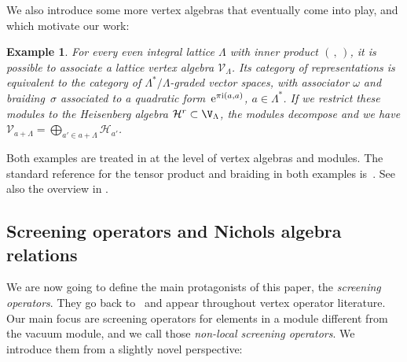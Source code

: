 \documentclass[10pt,a4paper]{amsart}
\numberwithin{equation}{section}
\newtheorem{ese}[teo]{Example}
\begin{document}
We also introduce some more vertex algebras that eventually come into play, and which motivate our work:

\begin{ese}
For every even integral lattice $\Lambda$ with inner product $(\,, \,)$, it is possible to associate a \emph{lattice vertex algebra} $\mathcal{V}_\Lambda$. Its category of representations is equivalent to the category of $\Lambda^*/\Lambda$-graded vector spaces, with associator $\omega$ and braiding~$\sigma$ associated to a quadratic form~${\rm e}^{\pi {\rm i} (a, a)}$, $a \in \Lambda^*$.
If we restrict these modules to the Heisenberg algebra $\mathcal{H}^r\subset \V_\Lambda$, the modules decompose and we have $\mathcal{V}_{a+\Lambda}=\bigoplus_{a'\in a+\Lambda} \mathcal{H}_{a'}$.
\end{ese}

Both examples are treated in \cite{FBZ04,Kac98} at the level of vertex algebras and modules. The standard reference for the tensor product and braiding in both examples is~\cite{DL93}. See also the overview in \cite[Section~2.3]{CGR20}.

\subsection{Screening operators and Nichols algebra relations} \label{smallTheorems}
We are now going to define the main protagonists of this paper, the \emph{screening operators}. They go back to~\cite{DF84} and appear throughout vertex operator literature. Our main focus are screening operators for elements in a module different from the vacuum module, and we call those \emph{non-local screening operators}. We introduce them from a slightly novel perspective:
\end{document}
